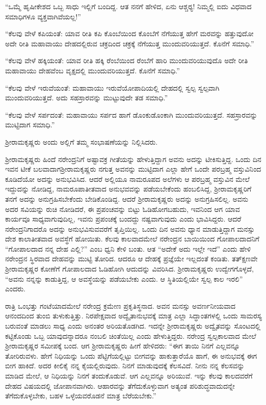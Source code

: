 \vskip 1pt

“ಒಮ್ಮೆ ಹೃಷೀಕೇಶದ ಒಬ್ಬ ಸಾಧು ಇಲ್ಲಿಗೆ ಬಂದಿದ್ದ. ಆತ ನನಗೆ ಹೇಳಿದ, ಏನು ಆಶ್ಚರ‍್ಯ! ನಿಮ್ಮಲ್ಲಿ ಐದು ವಿಧವಾದ ಸಮಾಧಿಗಳೂ ವ್ಯಕ್ತವಾಗಿವೆಯಲ್ಲ!”

\vskip 1pt

“ಕೆಲವು ವೇಳೆ ಕಪಿಯಂತೆ: ಯಾವ ರೀತಿ ಕಪಿ ಕೊಂಬೆಯಿಂದ ಕೊಂಬೆಗೆ ನೆಗೆಯುತ್ತ ಹೇಗೆ ಮರವನ್ನು ಹತ್ತುವುದೋ ಅದೇ ರೀತಿ ಮಹಾವಾಯು ದೇಹದಲ್ಲಿರುವ ಚಕ್ರದಿಂದ ಚಕ್ರಕ್ಕೆ ನೆಗೆಯುತ್ತ ಮುಂದುವರಿಯುತ್ತದೆ. ಕೊನೆಗೆ ಸಮಾಧಿ.”

\vskip 1pt

“ಕೆಲವು ವೇಳೆ ಹಕ್ಕಿಯಂತೆ: ಯಾವ ರೀತಿ ಹಕ್ಕಿ ರೆಂಬೆಯಿಂದ ರೆಂಬೆಗೆ ಹಾರಿ ಮುಂದುವರಿಯುವುದೊ ಅದೇ ರೀತಿ ಮಹಾವಾಯು ದೇಹವೆಂಬ ವೃಕ್ಷದಲ್ಲಿ ಮುಂದುವರಿಯುತ್ತದೆ. ಕೊನೆಗೆ ಸಮಾಧಿ.”

\vskip 1pt

“ಕೆಲವು ವೇಳೆ ಇರುವೆಯಂತೆ: ಮಹಾವಾಯು ಇರುವೆಯೋಪಾದಿಯಲ್ಲಿ ದೇಹದಲ್ಲಿ ಸ್ವಲ್ಪ ಸ್ವಲ್ಪವಾಗಿ ಮುಂದುವರಿಯುತ್ತದೆ. ಅದು ಸಹಸ್ರಾರವನ್ನು ಮುಟ್ಟುವುದೇ ತಡ ಸಮಾಧಿ.”

“ಕೆಲವು ವೇಳೆ ಸರ್ಪದಂತೆ: ಮಹಾವಾಯು ಸರ್ಪದ ಹಾಗೆ ಡೊಂಕುಡೊಂಕಾಗಿ ಮುಂದುವರಿಯುತ್ತದೆ. ಸಹಸ್ರಾರವನ್ನು ಮುಟ್ಟಿದಾಗ ಸಮಾಧಿ.”

ಶ‍್ರೀರಾಮಕೃಷ್ಣರು ಅಂದು ಅಲ್ಲಿಗೆ ತಮ್ಮ ಸಂಭಾಷಣೆಯನ್ನು ನಿಲ್ಲಿಸಿದರು.

ಶ‍್ರೀರಾಮಕೃಷ್ಣರು ಹಿಂದೆ ನರೇಂದ್ರನಿಗೆ ಅಷ್ಟಾವಕ್ರ ಗೀತೆಯನ್ನು ಹೇಳುತ್ತಿ\-ದ್ದಾಗ ಅವನು ಅದನ್ನು ಟೀಕಿಸುತ್ತಿದ್ದ. ಒಂದು ದಿನ ಇವನ ಟೀಕೆ ಬಲವಾದಾಗ\break ಶ‍್ರೀರಾಮಕೃಷ್ಣರು ನಗುತ್ತ ಅವನನ್ನು ಮುಟ್ಟಿದಾಗ ಎಲ್ಲಾ ಹೇಗೆ ಒಂದೇ ಪರಬ್ರಹ್ಮ ವಸ್ತುವಿನಿಂದ ಕೂಡಿದೆಯೋ ಅದನ್ನು ಅನುಭವಿಸಿದ. ಆದರೆ ಅಲ್ಲಿಯೂ ನಾಮರೂಪದ ಅಲೆಗಳು ಆ ಪರಬ್ರಹ್ಮ ವಸ್ತುವಿನ ಮೇಲೆ ಇದ್ದುದನ್ನು ನೋಡಿದ್ದ, ನಾಮರೂಪಾತೀತವಾದ ಅನುಭವವನ್ನು ಪಡೆಯಬೇಕೆಂದು ಹಂಬಲಿಸಿದ್ದ, ಶ‍್ರೀರಾಮಕೃಷ್ಣ\-ರಿಗೆ ತನಗೆ ಅದನ್ನು ಅನುಗ್ರಹಿಸಬೇಕೆಂದು ಬೇಡಿಕೊಂಡಿದ್ದ. ಆದರೆ ಶ‍್ರೀರಾಮಕೃಷ್ಣರು ಅದನ್ನು ಅನುಗ್ರಹಿಸಲಿಲ್ಲ. ಅವನು ಅದರ ಸವಿಯನ್ನು ರುಚಿ ನೋಡಿದರೆ, ಈ ಪ್ರಪಂಚವನ್ನು ಬಿಟ್ಟು ಓಡಿಹೋಗಬಹುದು, ಇವನಿಂದ ಆಗ ಯಾವ ಕಾರ್ಯವೂ ಸಾಧ್ಯವಾಗುವುದಿಲ್ಲ, ಇವನು ಪ್ರಪಂಚಕ್ಕೆ ಬಂದದ್ದು ನಷ್ಟವಾಗುವುದು ಎಂದು ಭಾವಿಸಿದ್ದರು. ಆದರೆ ನರೇಂದ್ರನಿಗಾದರೊ ಅದನ್ನು ಅನುಭವಿಸುವವರೆಗೆ ತೃಪ್ತಿಯಿಲ್ಲ. ಒಂದು ದಿನ ಅವನು ಧ್ಯಾನ ಮಾಡುತ್ತಿದ್ದಾಗ ಮನಸ್ಸು ದೇಶ ಕಾಲಾತೀತವಾದ ಅವಸ್ಥೆಗೆ ಹೋಯಿತು. ಕೆಲವು ಕಾಲವಾದಮೇಲೆ ನರೇಂದ್ರನ ಬಾಯಿಯಿಂದ ಗೋಪಾಲದಾದನಿಗೆ “ಗೋಪಾಲದಾದ ನನ್ನ ದೇಹ ಎಲ್ಲಿ?” ಎಂಬ ಧ್ವನಿ ಕೇಳಿ ಬಂತು. ಆತ “ಅದೇಕೆ ಅದು ಇಲ್ಲೇ ಇದೆ” ಎಂದು ಹೇಳಿ ನರೇಂದ್ರನ ಸ್ಥಿರವಾದ ದೇಹವನ್ನು ಮುಟ್ಟಿ ತೋರಿದ. ಆದರೂ ಆ ದೇಹಕ್ಕೆ ಪ್ರಜ್ಞೆಯೇ ಇಲ್ಲದಂತೆ ಕಂಡಿತು. ತತ್‍ಕ್ಷಣವೇ ಶ‍್ರೀರಾಮಕೃಷ್ಣರ ಕೋಣೆಗೆ ಗೋಪಾಲದಾದ ಓಡಿಹೋಗಿ ಆದುದನ್ನು ವಿವರಿಸಿದ. ಶ‍್ರೀರಾಮಕೃಷ್ಣರು ಉದ್ವೇಗಗೊಳ್ಳದೆ, “ಅವನು ನನ್ನನ್ನು ಕಾಡುತ್ತಿದ್ದ, ಆ ಅವಸ್ಥೆಯನ್ನು ಪಡೆಯಬೇಕು ಎಂದು. ಆ ಸ್ಥಿತಿಯಲ್ಲಿಯೇ ಸ್ವಲ್ಪ ಕಾಲ ಇರಲಿ” ಎಂದರು.

ರಾತ್ರಿ ಒಂಭತ್ತು ಗಂಟೆಯಾದಮೇಲೆ ನರೇಂದ್ರ ಕ್ರಮೇಣ ಪ್ರಕೃತಿಸ್ಥನಾದ. ಅವನ ಮನಸ್ಸು ಅವರ್ಣನೀಯವಾದ ಆನಂದದಿಂದ ತುಂಬಿ ತುಳುಕುತ್ತಿತ್ತು. ನಿರಪೇಕ್ಷವಾದ ಅದ್ವೈತಾನುಭವಕ್ಕೆ ಮಾತ್ರ ಎಲ್ಲಾ ಸಿದ್ಧಾಂತಗಳಲ್ಲಿ ಒಂದು ಸಾಮರಸ್ಯ ಬರುವಂತೆ ಮಾಡಲು ಸಾಧ್ಯ ಎಂದು ಅನಂತರ ಅರಿಯತೊಡಗಿದ. ಇದನ್ನೇ ಶ‍್ರೀರಾಮಕೃಷ್ಣರು ಅದ್ವೈತವನ್ನು ಸೊಂಟದಲ್ಲಿ ಕಟ್ಟಿಕೊಂಡು ಒಬ್ಬ ಯಾವುದನ್ನಾದರೂ ನಂಬಲಿ ಚಿಂತೆಯಿಲ್ಲ ಎಂದು ಹೇಳುತ್ತಿದ್ದರು. ನರೇಂದ್ರ ಸ್ವಲ್ಪಕಾಲವಾದ ಮೇಲೆ ಶ‍್ರೀರಾಮಕೃಷ್ಣರ ಸಮೀಪಕ್ಕೆ ಬಂದ. ಆಗ ಶ‍್ರೀರಾಮಕೃಷ್ಣರು ಹೀಗೆ ಹೇಳಿದರು: “ಈಗ ತಾಯಿ ನಿನಗೆ ಎಲ್ಲವನ್ನೂ ತೋರಿರುವಳು. ಹೇಗೆ ನಿಧಿಯನ್ನು ಒಂದು ಪೆಟ್ಟಿಗೆಯಲ್ಲಿಟ್ಟು ಬೀಗವನ್ನು ಹಾಕುತ್ತಾರೆಯೊ ಹಾಗೆ, ಈ ಅನುಭವಕ್ಕೆ ಈಗ ಬೀಗ ಹಾಕಿದೆ. ಅದರ ಕೀಲಿಕೈ ನನ್ನ ಕೈಯಲ್ಲಿರುವುದು. ನಿನಗೆ ಮಾಡುವುದಕ್ಕೆ ಕೆಲಸವಿದೆ. ನೀನು ನನ್ನ ಕೆಲಸವನ್ನು ಮಾಡಿದ ಮೇಲೆ, ಆ ನಿಧಿಯನ್ನು ನಿನಗೆ ತಂದುಕೊಡುವೆ. ಆಗ ಎಲ್ಲವನ್ನೂ ಅರಿಯುವೆ. ಇನ್ನು ಕೆಲವು ಕಾಲದವರೆಗೆ ದೇಹದ ವಿಷಯದಲ್ಲಿ ಜೋಪಾನವಾಗಿರು. ಆಹಾರವನ್ನು ತೆಗೆದುಕೊಳ್ಳುವಾಗ ಅತ್ಯಂತ ಪರಿಶುದ್ಧವಾದುದನ್ನೇ ತೆಗೆದುಕೊಳ್ಳಬೇಕು, ಬಹಳ ಒಳ್ಳೆಯವರೊಡನೆ ಮಾತ್ರ ಬೆರೆಯಬೇಕು.”

